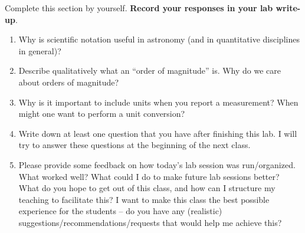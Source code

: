 \documentclass[11pt]{article}
\begin{document}
Complete this section by yourself. \textbf{Record your responses in your lab write-up}. 
\begin{enumerate}
    \item Why is scientific notation useful in astronomy (and in quantitative disciplines in general)?
    
    \item Describe qualitatively what an ``order of magnitude'' is. Why do we care about orders of magnitude?
    
    \item Why is it important to include units when you report a measurement? When might one want to perform a unit conversion?
    
    \item Write down at least one question that you have after finishing this lab. I will try to answer these questions at the beginning of the next class. 
    
    \item Please provide some feedback on how today's lab session was run/organized. What worked well? What could I do to make future lab sessions better? What do you hope to get out of this class, and how can I structure my teaching to facilitate this? I want to make this class the best possible experience for the students -- do you have any (realistic) suggestions/recommendations/requests that would help me achieve this?
\end{enumerate}
\end{document}
